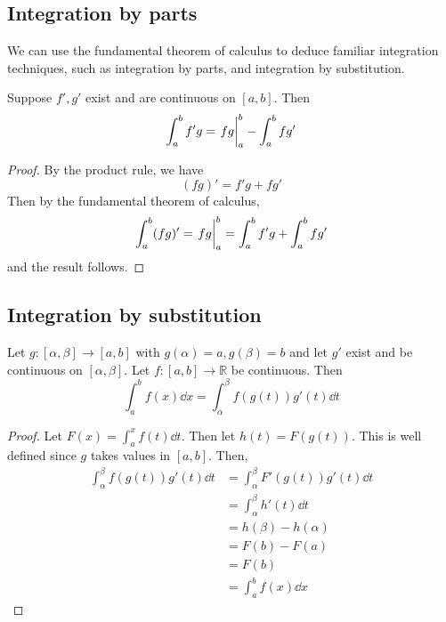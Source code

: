 \subsection{Integration by parts}
We can use the fundamental theorem of calculus to deduce familiar integration techniques, such as integration by parts, and integration by substitution.
\begin{corollary}
	Suppose \(f', g'\) exist and are continuous on \([a, b]\).
	Then
	\[
		\int_a^b f'g = \eval{fg}_a^b - \int_a^b fg'
	\]
\end{corollary}
\begin{proof}
	By the product rule, we have
	\[
		(fg)' = f'g + fg'
	\]
	Then by the fundamental theorem of calculus,
	\[
		\int_a^b (fg)' = \eval{fg}_a^b = \int_a^b f'g + \int_a^b fg'
	\]
	and the result follows.
\end{proof}

\subsection{Integration by substitution}
\begin{corollary}
	Let \(g \colon [\alpha, \beta] \to [a, b]\) with \(g(\alpha) = a, g(\beta) = b\) and let \(g'\) exist and be continuous on \([\alpha, \beta]\).
	Let \(f \colon [a, b] \to \mathbb R\) be continuous.
	Then
	\[
		\int_a^b f(x)\dd{x} = \int_\alpha^\beta f(g(t))g'(t)\dd{t}
	\]
\end{corollary}
\begin{proof}
	Let \(F(x) = \int_a^x f(t) \dd{t}\).
	Then let \(h(t) = F(g(t))\).
	This is well defined since \(g\) takes values in \([a, b]\).
	Then,
	\begin{align*}
		\int_\alpha^\beta f(g(t))g'(t)\dd{t} & = \int_\alpha^\beta F'(g(t))g'(t) \dd{t} \\
		                                     & = \int_\alpha^\beta h'(t) \dd{t}         \\
		                                     & = h(\beta) - h(\alpha)                   \\
		                                     & = F(b) - F(a)                            \\
		                                     & = F(b)                                   \\
		                                     & = \int_a^b f(x) \dd{x}
	\end{align*}
\end{proof}
